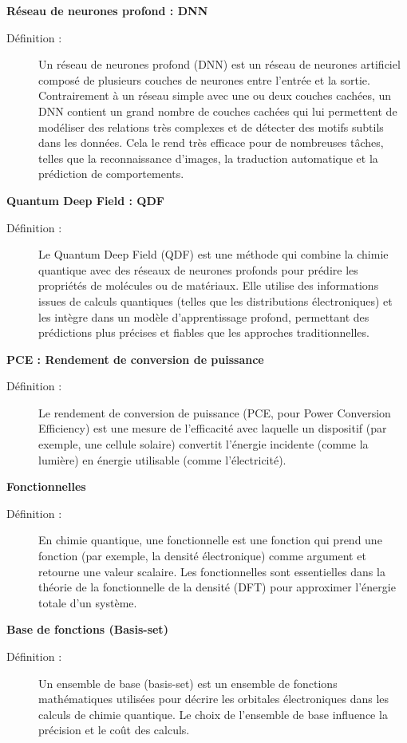\vspace{0.25cm}

\noindent \textbf{Réseau de neurones profond : DNN}
\begin{description}
  \item[Définition :] Un réseau de neurones profond (DNN) est un réseau de neurones artificiel composé de plusieurs couches de neurones entre l'entrée et la sortie. Contrairement à un réseau simple avec une ou deux couches cachées, un DNN contient un grand nombre de couches cachées qui lui permettent de modéliser des relations très complexes et de détecter des motifs subtils dans les données. Cela le rend très efficace pour de nombreuses tâches, telles que la reconnaissance d'images, la traduction automatique et la prédiction de comportements.
\end{description}

\vspace{0.25cm}

\noindent \textbf{Quantum Deep Field : QDF}
\begin{description}
  \item[Définition :] Le Quantum Deep Field (QDF) est une méthode qui combine la chimie quantique avec des réseaux de neurones profonds pour prédire les propriétés de molécules ou de matériaux. Elle utilise des informations issues de calculs quantiques (telles que les distributions électroniques) et les intègre dans un modèle d'apprentissage profond, permettant des prédictions plus précises et fiables que les approches traditionnelles.
\end{description}

\noindent \textbf{PCE : Rendement de conversion de puissance}
\begin{description}
  \item[Définition :] Le rendement de conversion de puissance (PCE, pour Power Conversion Efficiency) est une mesure de l'efficacité avec laquelle un dispositif (par exemple, une cellule solaire) convertit l'énergie incidente (comme la lumière) en énergie utilisable (comme l'électricité).
\end{description}

\noindent \textbf{Fonctionnelles}
\begin{description}
  \item[Définition :] En chimie quantique, une fonctionnelle est une fonction qui prend une fonction (par exemple, la densité électronique) comme argument et retourne une valeur scalaire. Les fonctionnelles sont essentielles dans la théorie de la fonctionnelle de la densité (DFT) pour approximer l'énergie totale d'un système.
\end{description}

\noindent \textbf{Base de fonctions (Basis-set)}
\begin{description}
  \item[Définition :] Un ensemble de base (basis-set) est un ensemble de fonctions mathématiques utilisées pour décrire les orbitales électroniques dans les calculs de chimie quantique. Le choix de l'ensemble de base influence la précision et le coût des calculs.
\end{description}